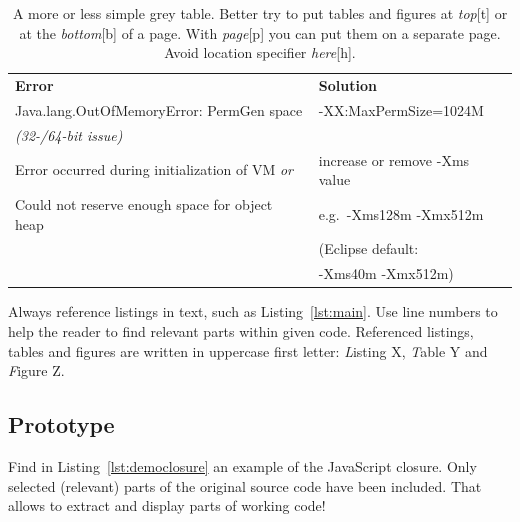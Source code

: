  \begin{center} 
  \begin{table}[tbp]
    \begin{tabular}{ l | l }
      \rowcolor{gray20}\textbf{Error}  
        & \textbf{Solution} \\
      \rowcolor{gray5}Java.lang.OutOfMemoryError: PermGen space
        & -XX:MaxPermSize=1024M \\
      \rowcolor{gray5}\textit{(32-/64-bit issue)}
        & \\
      \rowcolor{gray20}Error occurred during initialization of VM \textit{or}
        & increase or remove -Xms value \\
      \rowcolor{gray20}Could not reserve enough space for object heap
        & e.g.\ -Xms128m -Xmx512m \\
      \rowcolor{gray20}  	  	  
        & \small{(Eclipse default:}\\
      \rowcolor{gray20}  	  	  
        & \small{-Xms40m -Xmx512m)} \\
    \end{tabular}
    \caption[Simple Grey Table]{A more or less simple grey table. Better try to put tables and figures at \textit{top}[t] or at the \textit{bottom}[b] of a page. With \textit{page}[p] you can put them on a separate page. Avoid location specifier \textit{here}[h].}
    \label{tab:grey}
  \end{table}
\end{center}



Always reference listings in text, such as Listing~\ref{lst:main}. Use line numbers to help the reader to find relevant parts within given code. Referenced listings, tables and figures are written in uppercase first letter: \emph{L}isting X,  \emph{T}able Y and  \emph{F}igure Z.




\subsection{Prototype}

Find in Listing~\ref{lst:democlosure} an example of the JavaScript closure. Only selected (relevant) parts of the original source code have been included. That allows to extract and display parts of working code!

